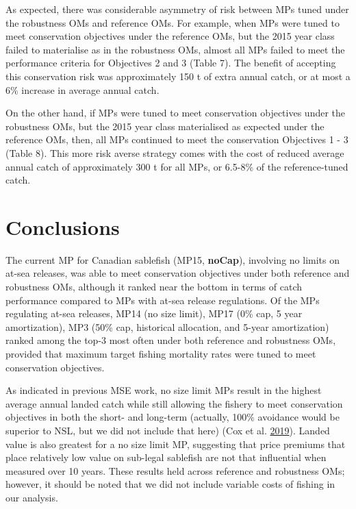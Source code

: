 \documentclass[11pt]{book}
\begin{document}
As expected, there was considerable asymmetry of risk between MPs tuned under the robustness OMs and reference OMs. For example, when MPs were tuned to meet conservation objectives under the reference OMs, but the 2015 year class failed to materialise as in the robustness OMs, almost all MPs failed to meet the performance criteria for Objectives 2 and 3 (Table 7). The benefit of accepting this conservation risk was approximately 150 t of extra annual catch, or at most a 6\% increase in average annual catch.

On the other hand, if MPs were tuned to meet conservation objectives under the robustness OMs, but the 2015 year class materialised as expected under the reference OMs, then, all MPs continued to meet the conservation Objectives 1 - 3 (Table 8). This more risk averse strategy comes with the cost of reduced average annual catch of approximately 300 t for all MPs, or 6.5-8\% of the reference-tuned catch.

\hypertarget{conclusions}{%
\section{Conclusions}\label{conclusions}}

The current MP for Canadian sablefish (MP15, \textbf{noCap}), involving no limits on at-sea releases, was able to meet conservation objectives under both reference and robustness OMs, although it ranked near the bottom in terms of catch performance compared to MPs with at-sea release regulations. Of the MPs regulating at-sea releases, MP14 (no size limit), MP17 (0\% cap, 5 year amortization), MP3 (50\% cap, historical allocation, and 5-year amortization) ranked among the top-3 most often under both reference and robustness OMs, provided that maximum target fishing mortality rates were tuned to meet conservation objectives.

As indicated in previous MSE work, no size limit MPs result in the highest average annual landed catch while still allowing the fishery to meet conservation objectives in both the short- and long-term (actually, 100\% avoidance would be superior to NSL, but we did not include that here) (Cox et al. \protect\hyperlink{ref-cox2019evaluating}{2019}). Landed value is also greatest for a no size limit MP, suggesting that price premiums that place relatively low value on sub-legal sablefish are not that influential when measured over 10 years. These results held across reference and robustness OMs; however, it should be noted that we did not include variable costs of fishing in our analysis.
\end{document}
